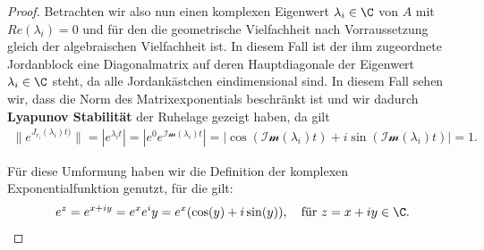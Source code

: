 \documentclass[letterpaper,10pt,german]{jupyterBook}
\begin{document}
\begin{proof}
\par
Betrachten wir also nun einen komplexen Eigenwert \(\lambda_i \in \C\) von \(A\) mit \(Re(\lambda_i)=0\) und für den die geometrische Vielfachheit nach Vorraussetzung gleich der algebraischen Vielfachheit ist.
In diesem Fall ist der ihm zugeordnete Jordanblock eine Diagonalmatrix auf deren Hauptdiagonale der Eigenwert \(\lambda_i \in \C\) steht, da alle Jordankästchen eindimensional sind.
In diesem Fall sehen wir, dass die Norm des Matrixexponentials beschränkt ist und wir dadurch \textbf{Lyapunov Stabilität} der Ruhelage gezeigt haben, da gilt
\begin{align*}
\|e^{J_{r_i}(\lambda_i)t)}\| = |e^{\lambda_i t}| = |e^0e^{\mathcal{Im}(\lambda_i) t}| = |\cos{(\mathcal{Im}(\lambda_i)t)} + i \sin{(\mathcal{Im}(\lambda_i)t)}| = 1.
\end{align*}
\par
Für diese Umformung haben wir die Definition der komplexen Exponentialfunktion genutzt, für die gilt:
\begin{align*}
e^z = e^{x+iy} = e^xe^iy = e^x(\cos(y) + i\sin(y)), \quad \text{für } z = x+iy \in \C.
\end{align*}\end{proof}
\end{document}
